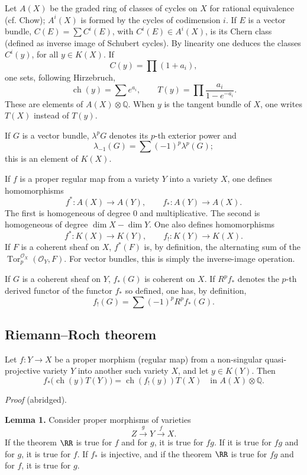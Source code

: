 \documentclass[11pt]{article}
\newcommand{\ch}{\operatorname{ch}}
\newcommand{\Tor}{\operatorname{Tor}}
\providecommand{\ch}{\operatorname{ch}}
\providecommand{\Tor}{\operatorname{Tor}}
\begin{document}
Let \(A(X)\) be the graded ring of classes of cycles on \(X\) for rational equivalence (cf. Chow); \(A^i(X)\) is formed by the cycles of codimension \(i\). If \(E\) is a vector bundle, \(C(E)=\sum C^i(E)\), with \(C^i(E)\in A^i(X)\), is its Chern class (defined as inverse image of Schubert cycles). By linearity one deduces the classes \(C^i(y)\), for all \(y\in K(X)\). If
\[
  C(y)=\prod (1+a_i),
\]
one sets, following Hirzebruch,
\[
  \ch(y)=\sum e^{a_i},\qquad
  T(y)=\prod\frac{a_i}{1-e^{-a_i}}.
\]
These are elements of \(A(X)\otimes\mathbb Q\). When \(y\) is the tangent bundle of \(X\), one writes \(T(X)\) instead of \(T(y)\).

If \(G\) is a vector bundle, \(\lambda^pG\) denotes its \(p\)-th exterior power and
\[
  \lambda_{-1}(G)=\sum(-1)^p\lambda^p(G);
\]
this is an element of \(K(X)\).

If \(f\) is a proper regular map from a variety \(Y\) into a variety \(X\), one defines homomorphisms
\[
  f^*:A(X)\longrightarrow A(Y),\qquad
  f_*:A(Y)\longrightarrow A(X).
\]
The first is homogeneous of degree \(0\) and multiplicative. The second is homogeneous of degree \(\dim X-\dim Y\). One also defines homomorphisms
\[
  f^*:K(X)\longrightarrow K(Y),\qquad
  f_!:K(Y)\longrightarrow K(X).
\]
If \(F\) is a coherent sheaf on \(X\), \(f^*(F)\) is, by definition, the alternating sum of the \(\Tor_p^{\mathcal O_X}(\mathcal O_Y,F)\). For vector bundles, this is simply the inverse-image operation.

If \(G\) is a coherent sheaf on \(Y\), \(f_*(G)\) is coherent on \(X\). If \(R^pf_*\) denotes the \(p\)-th derived functor of the functor \(f_*\) so defined, one has, by definition,
\[
  f_!(G)=\sum(-1)^p R^pf_*(G).
\]

\subsection*{Riemann--Roch theorem}
Let \(f:Y\to X\) be a proper morphism (regular map) from a non-singular quasi-projective variety \(Y\) into another such variety \(X\), and let \(y\in K(Y)\). Then
\begin{equation}\tag{1}
  f_*\bigl(\ch(y)T(Y)\bigr)=\ch(f_!(y))T(X)
  \quad\text{in } A(X)\otimes\mathbb Q.
\end{equation}

\emph{Proof} (abridged).

\textbf{Lemma 1.} Consider proper morphisms of varieties
\[
  Z \xrightarrow{g} Y \xrightarrow{f} X.
\]
If the theorem \(\RR\) is true for \(f\) and for \(g\), it is true for \(fg\). If it is true for \(fg\) and for \(g\), it is true for \(f\). If \(f_*\) is injective, and if the theorem \(\RR\) is true for \(fg\) and for \(f\), it is true for \(g\).
\end{document}

